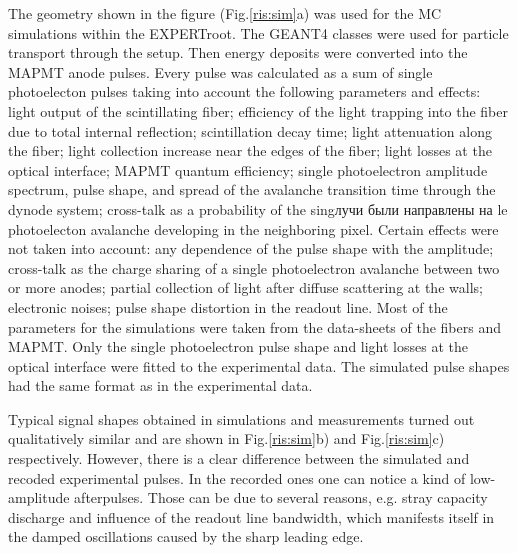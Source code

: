 \documentclass{webofc}
\newcommand{\er}{\textmd{EXPERTroot}}
\begin{document}
The geometry shown in the figure (Fig.\ref{ris:sim}a) was used for the MC simulations within the \er. The GEANT4\cite{geant4} classes were used for particle transport through the setup. Then energy deposits were  converted into the MAPMT anode pulses. Every pulse was calculated as a sum of single photoelecton pulses taking into account the following parameters and effects: light output of the scintillating fiber; efficiency of the light trapping into the fiber due to total internal reflection; scintillation decay time; light attenuation along the fiber; light collection increase near the edges of the fiber; light losses at the optical interface; MAPMT quantum efficiency; single photoelectron amplitude spectrum, pulse shape, and spread of the avalanche transition time through the dynode system; cross-talk as a probability of the singлучи были направлены на le photoelecton avalanche developing in the neighboring pixel.
Certain effects were not taken into account: any dependence of the pulse shape with the amplitude; cross-talk as the charge sharing of a single photoelectron avalanche between two or more anodes; partial collection of light after diffuse scattering at the walls; electronic noises; pulse shape distortion in the readout line. Most of the parameters for the simulations were taken from the data-sheets of the fibers and MAPMT.  Only the single photoelectron pulse shape and light losses at the optical interface were fitted to the experimental data. The simulated pulse shapes had the same format as in the experimental data.

Typical signal shapes obtained in simulations and measurements turned out qualitatively similar and are shown in Fig.\ref{ris:sim}b) and Fig.\ref{ris:sim}c) respectively. However, there is a clear difference between the simulated and recoded experimental pulses. In the recorded ones one can notice a kind of low-amplitude afterpulses.  Those can be due to several reasons, e.g. stray capacity discharge and influence of the readout line bandwidth, which manifests itself in the damped oscillations caused by the sharp leading edge.
\end{document}
